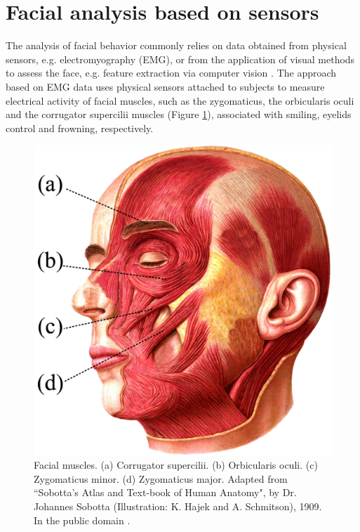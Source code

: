 \section{Facial analysis based on sensors}

The analysis of facial behavior commonly relies on data obtained from physical sensors, e.g. electromyography (EMG), or from the application of visual methods to assess the face, e.g. feature extraction via computer vision \parencite{schrader2017rising}. The approach based on EMG data uses physical sensors attached to subjects to measure electrical activity of facial muscles, such as the zygomaticus, the orbicularis oculi and the corrugator supercilii muscles (Figure \ref{fig:face-muscles}), associated with smiling, eyelids control and frowning, respectively.

\begin{figure}
\centering
\includegraphics[width=1.0\textwidth]{Content/figures/face-muscles.jpg}
\caption{Facial muscles. (a) Corrugator supercilii. (b) Orbicularis oculi. (c) Zygomaticus minor. (d) Zygomaticus major. Adapted from ``Sobotta's Atlas and Text-book of Human Anatomy", by Dr. Johannes Sobotta (Illustration: K. Hajek and A. Schmitson), 1909. In the public domain \parencite{sobotta1909wikimedia}.}
\label{fig:face-muscles}
\end{figure}

